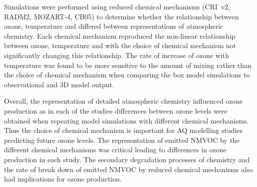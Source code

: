 Simulations were performed using reduced chemical mechanisms (CRI~v2, RADM2, MOZART-4, CB05) to determine whether the relationship between ozone, temperature and  differed between representations of atmospheric chemistry.
Each chemical mechanism reproduced the non-linear relationship between ozone, temperature and  with the choice of chemical mechanism not significantly changing this relationship.
The rate of increase of ozone with temperature was found to be more sensitive to the amount of mixing rather than the choice of chemical mechanism when comparing the box model simulations to observational and 3D model output.

Overall, the representation of detailed atmospheric chemistry influenced ozone production as in each of the studies differences between ozone levels were obtained when repeating model simulations with different chemical mechanisms.
Thus the choice of chemical mechanism is important for AQ modelling studies predicting future ozone levels.
The representation of emitted NMVOC by the different chemical mechanisms was critical leading to differences in ozone production in each study.
The secondary degradation processes of  chemistry and the rate of break down of emitted NMVOC by reduced chemical mechanisms also had implications for ozone production.
